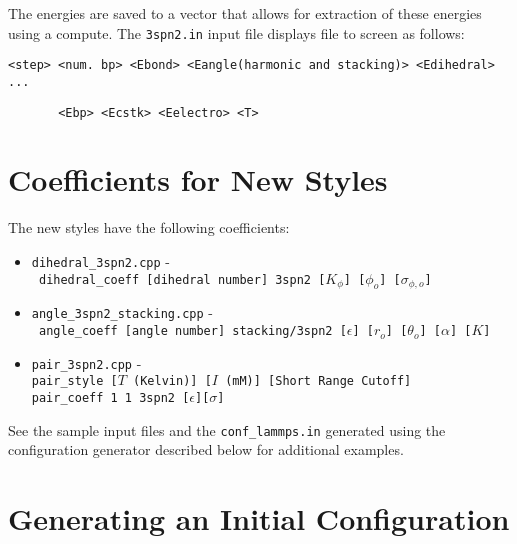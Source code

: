 \documentclass[11pt]{amsart}
\begin{document}
The energies are saved to a vector that allows for extraction of these energies
using a compute.  The \texttt{3spn2.in} input file displays file to screen as
follows:
\begin{verbatim}
<step> <num. bp> <Ebond> <Eangle(harmonic and stacking)> <Edihedral> ...
\end{verbatim} 
\begin{verbatim}
       <Ebp> <Ecstk> <Eelectro> <T>
\end{verbatim}

\section{Coefficients for New Styles}

The new styles have the following coefficients:
\begin{itemize}
\item \texttt{dihedral\_3spn2.cpp} - \\
\indent \texttt{ dihedral\_coeff [dihedral number] 3spn2 [$K_\phi$] [$\phi_o$] [$\sigma_{\phi,o}$]}
\item \texttt{angle\_3spn2\_stacking.cpp} - \\
\indent \texttt{ angle\_coeff [angle number] stacking/3spn2 [$\epsilon$] [$r_o$] [$\theta_o$] [$\alpha$] [$K$]}
\item \texttt{pair\_3spn2.cpp} - \\
\indent \texttt{pair\_style [$T$ (Kelvin)] [$I$ (mM)] [Short Range Cutoff]} \\
\indent \texttt{pair\_coeff 1 1 3spn2 [$\epsilon$][$\sigma$]} 
\end{itemize}

See the sample input files and the \texttt{conf\_lammps.in} generated using the
configuration generator described below for additional examples.

\section{Generating an Initial Configuration}
\end{document}
